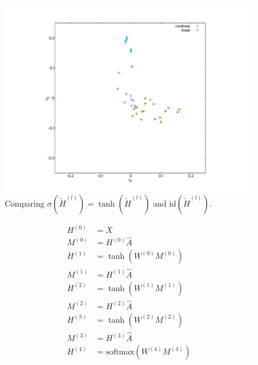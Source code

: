 \documentclass[mathserif,10pt]{beamer}
\begin{document}
\begin{frame}
  \begin{figure}
    \includegraphics[scale=0.25]{figs/fig01c.pdf}
    \caption{Comparing $\sigma(\tilde{H}^{(l)}) = \tanh(\tilde{H}^{(l)})$ and $\text{id}(\tilde{H}^{(l)})$.}
  \end{figure}
\end{frame}

\begin{frame}
  \begin{subequations}
    \begin{align}
      H^{(0)} &= X \\
      M^{(0)} &= H^{(0)}\hat{A} \\
      H^{(1)} &= \tanh \left(W^{(0)} M^{(0)}\right) \\
      M^{(1)} &= H^{(1)}\hat{A} \\
      H^{(2)} &= \tanh \left(W^{(1)} M^{(1)}\right) \\
      M^{(2)} &= H^{(2)}\hat{A} \\
      H^{(3)} &= \tanh \left(W^{(2)} M^{(2)}\right) \\
      M^{(3)} &= H^{(3)}\hat{A} \\
      H^{(4)} &= \text{softmax}\left(W^{(4)} M^{(4)}\right)
    \end{align}
  \end{subequations} 
\end{frame}
\end{document}
